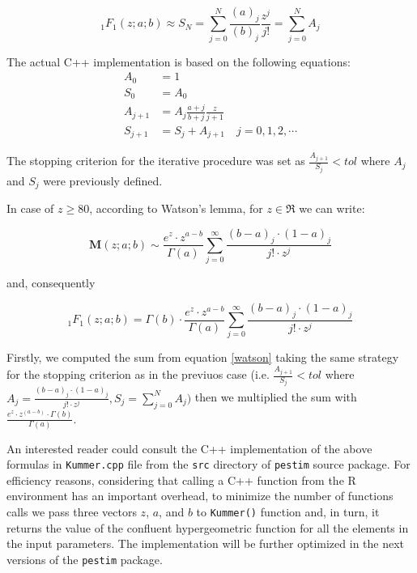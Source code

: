 \documentclass[12pt, a4paper]{article}
\begin{document}
\begin{equation}
{}_{1}F_{1}(z; a; b) \approx S_{N} = \sum_{j=0}^{N} \frac{(a)_{j}}{(b)_{j}} \frac{z^{j}}{j!} = \sum_{j=0}^{N} A_{j}
\end{equation}

The actual C++ implementation is based on the following equations:
\begin{align}
A_{0} &=1 \\
S_{0} &=A_{0} \\
A_{j+1} &=A_{j} \frac{a+j}{b+j} \frac{z}{j+1} \\
S_{j+1} &=S_{j}+A_{j+1} \quad j=0,1,2,\cdots
\end{align}

The stopping criterion for the iterative procedure was set as $\frac{A_{j+1}}{S_{j}} < tol$ 
where $A_j$ and $S_j$ were previously defined.

In case of $z \ge 80$, according to Watson’s lemma, for $z \in \Re$ we can write:

\begin{equation}\label{watson}
\mathbf{M}(z; a; b) \sim \frac{e^z \cdot z^{a-b}}{\Gamma(a)} \sum_{j=0}^{\infty} \frac{(b-a)_j \cdot (1-a)_j}{j! \cdot z^j}
\end{equation}

\noindent and, consequently

\begin{equation}
{}_{1}F_{1}(z; a; b) = \Gamma(b) \cdot \frac{e^z \cdot z^{a-b}}{\Gamma(a)} \sum_{j=0}^{\infty} \frac{(b-a)_j \cdot (1-a)_j}{j! \cdot z^j}
\end{equation}

Firstly, we computed the sum from equation \ref{watson} taking the same strategy for the stopping 
criterion as in the previuos case (i.e. $\frac{A_{j+1}}{S_{j}} < tol$ where $A_j = \frac{(b-a)_j \cdot (1-a)_j}{j! \cdot z^j}, S_j=\sum_{j=0}^{N} A_j)$ then we multiplied the sum 
with $\frac{e^z \cdot z^{(a-b)} \cdot \Gamma(b)}{\Gamma(a)}$.

An interested reader could consult the C++ implementation of the above formulas in \texttt{Kummer.cpp} 
file from the \texttt{src} directory of \texttt{pestim} source package. For efficiency reasons, considering 
that calling a C++ function from the R environment has an important overhead, to minimize the number 
of functions calls we pass three vectors $z$, $a$, and $b$ to \texttt{Kummer()} function and, in turn, it 
returns the value of the confluent hypergeometric function for all the elements in the input parameters. 
The  implementation will be further optimized in the next versions of the \texttt{pestim} package.
\end{document}
